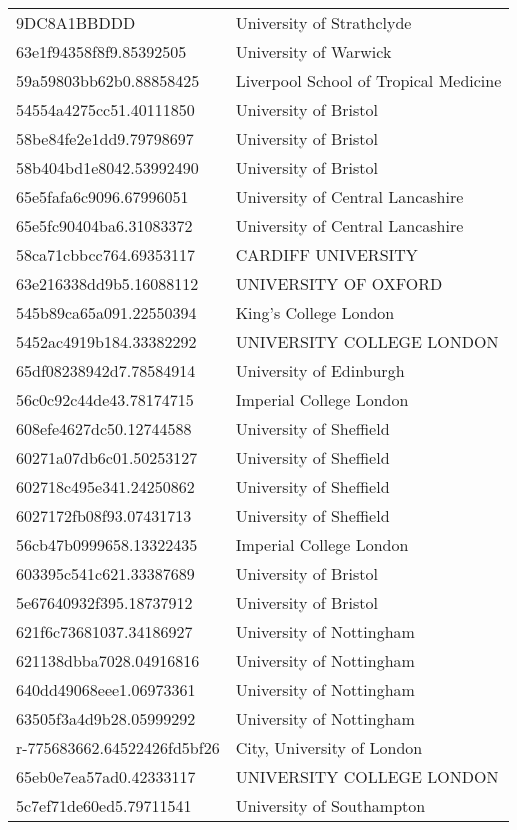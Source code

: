 \begin{tabular}{ll}
9DC8A1BBDDD & University of Strathclyde \\
63e1f94358f8f9.85392505 & University of Warwick \\
59a59803bb62b0.88858425 & Liverpool School of Tropical Medicine \\
54554a4275cc51.40111850 & University of Bristol \\
58be84fe2e1dd9.79798697 & University of Bristol \\
58b404bd1e8042.53992490 & University of Bristol \\
65e5fafa6c9096.67996051 & University of Central Lancashire \\
65e5fc90404ba6.31083372 & University of Central Lancashire \\
58ca71cbbcc764.69353117 & CARDIFF UNIVERSITY \\
63e216338dd9b5.16088112 & UNIVERSITY OF OXFORD \\
545b89ca65a091.22550394 & King's College London \\
5452ac4919b184.33382292 & UNIVERSITY COLLEGE LONDON \\
65df08238942d7.78584914 & University of Edinburgh \\
56c0c92c44de43.78174715 & Imperial College London \\
608efe4627dc50.12744588 & University of Sheffield \\
60271a07db6c01.50253127 & University of Sheffield \\
602718c495e341.24250862 & University of Sheffield \\
6027172fb08f93.07431713 & University of Sheffield \\
56cb47b0999658.13322435 & Imperial College London \\
603395c541c621.33387689 & University of Bristol \\
5e67640932f395.18737912 & University of Bristol \\
621f6c73681037.34186927 & University of Nottingham \\
621138dbba7028.04916816 & University of Nottingham \\
640dd49068eee1.06973361 & University of Nottingham \\
63505f3a4d9b28.05999292 & University of Nottingham \\
r-775683662.64522426fd5bf26 & City, University of London \\
65eb0e7ea57ad0.42333117 & UNIVERSITY COLLEGE LONDON \\
5c7ef71de60ed5.79711541 & University of Southampton \\

\end{tabular}
